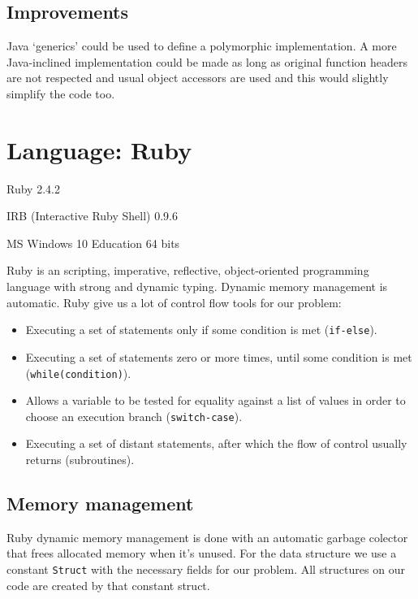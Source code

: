 \documentclass[11pt]{scrartcl} %
\begin{document}
\subsection*{Improvements}
Java `generics' could be used to define a polymorphic implementation. A more Java-inclined implementation could be made as long as original function headers are not respected and usual object accessors are used and this would slightly simplify the code too.

\section{Language: Ruby}

\begin{description}[align=left,labelwidth=10em]
\item [Language Version] Ruby 2.4.2
\item [Interpreter] IRB (Interactive Ruby Shell) 0.9.6
\item [Operating System] MS Windows 10 Education 64 bits
\end{description}

Ruby is an scripting, imperative, reflective, object-oriented programming language with strong and dynamic typing. Dynamic memory management is automatic. Ruby give us a lot of control flow tools for our problem:

\begin{itemize}  
\item Executing a set of statements only if some condition is met (\texttt{if-else}).
\item Executing a set of statements zero or more times, until some condition is met (\texttt{while(condition)}). 
\item Allows a variable to be tested for equality against a list of values in order to choose an execution branch (\texttt{switch-case}).
\item Executing a set of distant statements, after which the flow of control usually returns (subroutines).
\end{itemize}

\subsection*{Memory management}

Ruby dynamic memory management is done with an automatic garbage colector that frees allocated memory when it's unused. For the data structure we use a constant \texttt{Struct} with the necessary fields for our problem. All structures on our code are created by that constant struct.
\end{document}
